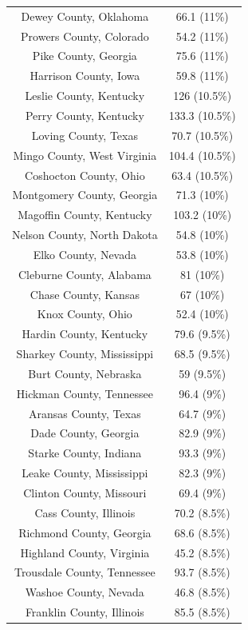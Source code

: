 \begin{table}[ht]
\begin{tabular}{cc}
  Dewey County, Oklahoma & 66.1 (11\%) \\ 
  Prowers County, Colorado & 54.2 (11\%) \\ 
  Pike County, Georgia & 75.6 (11\%) \\ 
  Harrison County, Iowa & 59.8 (11\%) \\ 
  Leslie County, Kentucky & 126 (10.5\%) \\ 
  Perry County, Kentucky & 133.3 (10.5\%) \\ 
  Loving County, Texas & 70.7 (10.5\%) \\ 
  Mingo County, West Virginia & 104.4 (10.5\%) \\ 
  Coshocton County, Ohio & 63.4 (10.5\%) \\ 
  Montgomery County, Georgia & 71.3 (10\%) \\ 
  Magoffin County, Kentucky & 103.2 (10\%) \\ 
  Nelson County, North Dakota & 54.8 (10\%) \\ 
  Elko County, Nevada & 53.8 (10\%) \\ 
  Cleburne County, Alabama & 81 (10\%) \\ 
  Chase County, Kansas & 67 (10\%) \\ 
  Knox County, Ohio & 52.4 (10\%) \\ 
  Hardin County, Kentucky & 79.6 (9.5\%) \\ 
  Sharkey County, Mississippi & 68.5 (9.5\%) \\ 
  Burt County, Nebraska & 59 (9.5\%) \\ 
  Hickman County, Tennessee & 96.4 (9\%) \\ 
  Aransas County, Texas & 64.7 (9\%) \\ 
  Dade County, Georgia & 82.9 (9\%) \\ 
  Starke County, Indiana & 93.3 (9\%) \\ 
  Leake County, Mississippi & 82.3 (9\%) \\ 
  Clinton County, Missouri & 69.4 (9\%) \\ 
  Cass County, Illinois & 70.2 (8.5\%) \\ 
  Richmond County, Georgia & 68.6 (8.5\%) \\ 
  Highland County, Virginia & 45.2 (8.5\%) \\ 
  Trousdale County, Tennessee & 93.7 (8.5\%) \\ 
  Washoe County, Nevada & 46.8 (8.5\%) \\ 
  Franklin County, Illinois & 85.5 (8.5\%) \\ 

\end{tabular}
\end{table}
